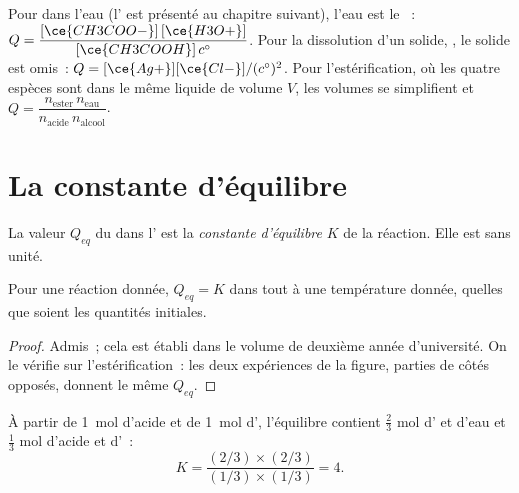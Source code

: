 \begin{example}\label{ex:g12:equilibrium:quotients}
Pour  dans l'eau (l' 
est présenté au chapitre suivant), l'eau est le ~:
$Q = \dfrac{[\ce{CH3COO-}]\,[\ce{H3O+}]}{[\ce{CH3COOH}]\,c^\circ}$. Pour la
dissolution d'un solide, , le solide est
omis~:
$Q = [\ce{Ag+}][\ce{Cl-}]/(c^\circ)^2$. Pour l'estérification, où les
quatre espèces sont dans le même  liquide de volume $V$, les
volumes se simplifient et $Q = \dfrac{n_{\text{ester}}\, n_{\text{eau}}}{n_{\text{acide}}\, n_{\text{alcool}}}$.
\end{example}

\section{La constante d'équilibre}

\begin{definition}\label{def:g12:equilibrium:constant}
La valeur $Q_{eq}$ du  dans l' est
la \emph{constante d'équilibre} $K$ de la
réaction. Elle est sans unité.
\end{definition}

\begin{proposition}\label{prop:g12:equilibrium:constant}
Pour une réaction donnée, $Q_{eq} = K$ dans tout  à une
température donnée, quelles que soient les quantités initiales.
\end{proposition}

\begin{proof}
Admis~; cela est établi dans le volume de deuxième année d'université.
On le vérifie sur l'estérification~: les deux expériences de la figure,
parties de côtés opposés, donnent le même $Q_{eq}$.
\end{proof}

\begin{example}\label{ex:g12:equilibrium:k-ester}
À partir de \qty{1}{mol} d'acide et de \qty{1}{mol} d',
l'équilibre contient $\frac{2}{3}$ mol d' et d'eau et
$\frac{1}{3}$ mol d'acide et d'~:
\[
  K = \frac{(2/3)\times(2/3)}{(1/3)\times(1/3)} = 4 .
\]
\end{example}

